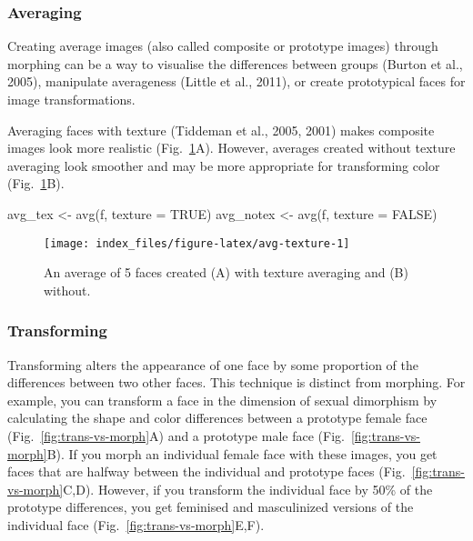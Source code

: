 \documentclass[
  doc,floatsintext]{apa6}
\newenvironment{Shaded}{\begin{snugshade}}{\end{snugshade}}
\newcommand{\AttributeTok}[1]{\textcolor[rgb]{0.77,0.63,0.00}{#1}}
\newcommand{\ConstantTok}[1]{\textcolor[rgb]{0.00,0.00,0.00}{#1}}
\newcommand{\FunctionTok}[1]{\textcolor[rgb]{0.00,0.00,0.00}{#1}}
\newcommand{\NormalTok}[1]{#1}
\newcommand{\OtherTok}[1]{\textcolor[rgb]{0.56,0.35,0.01}{#1}}
\begin{document}
\hypertarget{averaging}{%
\subsubsection{Averaging}\label{averaging}}

Creating average images (also called composite or prototype images) through morphing can be a way to visualise the differences between groups (Burton et al., 2005), manipulate averageness (Little et al., 2011), or create prototypical faces for image transformations.

Averaging faces with texture (Tiddeman et al., 2005, 2001) makes composite images look more realistic (Fig.~\ref{fig:avg-texture}A). However, averages created without texture averaging look smoother and may be more appropriate for transforming color (Fig.~\ref{fig:avg-texture}B).

\begin{Shaded}
\begin{Highlighting}[]
\NormalTok{avg\_tex }\OtherTok{\textless{}{-}} \FunctionTok{avg}\NormalTok{(f, }\AttributeTok{texture =} \ConstantTok{TRUE}\NormalTok{)}
\NormalTok{avg\_notex }\OtherTok{\textless{}{-}} \FunctionTok{avg}\NormalTok{(f, }\AttributeTok{texture =} \ConstantTok{FALSE}\NormalTok{)}
\end{Highlighting}
\end{Shaded}

\begin{figure}
\texttt{[image: index\_files/figure-latex/avg-texture-1]} \caption{An average of 5 faces created (A) with texture averaging and (B) without.}\label{fig:avg-texture}
\end{figure}

\hypertarget{transforming}{%
\subsubsection{Transforming}\label{transforming}}

Transforming alters the appearance of one face by some proportion of the differences between two other faces. This technique is distinct from morphing. For example, you can transform a face in the dimension of sexual dimorphism by calculating the shape and color differences between a prototype female face (Fig.~\ref{fig:trans-vs-morph}A) and a prototype male face (Fig.~\ref{fig:trans-vs-morph}B). If you morph an individual female face with these images, you get faces that are halfway between the individual and prototype faces (Fig.~\ref{fig:trans-vs-morph}C,D). However, if you transform the individual face by 50\% of the prototype differences, you get feminised and masculinized versions of the individual face (Fig.~\ref{fig:trans-vs-morph}E,F).
\end{document}
